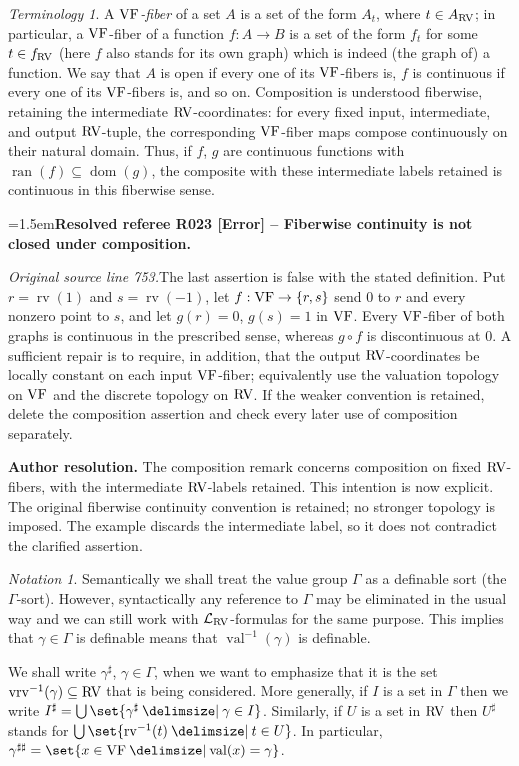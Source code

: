\documentclass[12pt]{amsart}
\newcommand{\ResolvedRefereeRemark}[5]{%
  \par\medskip\begingroup\normalfont\small\color{gray}%
  \emergencystretch=1.5em\noindent\textbf{Resolved referee R#1 [#2] -- #3.}\par\nobreak\noindent #4\par
  \medskip\color{ResolutionGreen}\noindent\textbf{Author resolution.} #5\par
  \endgroup\medskip
}
\newcommand{\memph}[1]{{\color{magenta}\emph{#1}}}
\theoremstyle{plain}
\theoremstyle{definition}
\theoremstyle{remark}
\newtheorem{ter}[thm]{Terminology}
\newtheorem{nota}[thm]{Notation}
\numberwithin{equation}{section}
\theoremstyle{plain}
\newcommand{\VF}{\textup{VF}}
\newcommand{\RV}{\textup{RV}}
\DeclareMathOperator{\ran}{ran}
\DeclareMathOperator{\dom}{dom}
\newcommand{\0}{\emptyset}
\newcommand{\lan}[3]{\mathcal{L}_{#1 \textup{#2} #3}}
\newcommand{\fun}{\longrightarrow}
\newcommand{\sub}{\subseteq}
\providecommand\given{}
\newcommand\SetSymbol[1][]{%
\nonscript \: #1 \vert
\allowbreak
\nonscript\:
\mathopen{}}
\renewcommand\given{\SetSymbol[\delimsize]}
\DeclareMathOperator{\rv}{rv}
\DeclareMathOperator{\vv}{val}
\DeclareMathOperator{\vrv}{vrv}
\begin{document}
\begin{ter}\label{rvfiber}
A \memph{$\VF$-fiber} of a set $A$ is a set of the form $A_t$, where $t \in A_{\RV}$; in particular,  a $\VF$-fiber of a function $f : A \fun B$ is a set of the form $f_t$ for some  $t \in f_{\RV}$ (here $f$ also stands for its own graph) which is indeed (the graph of) a function.  We say that $A$ is open if every one of its $\VF$-fibers is, $f$ is continuous if every one of its $\VF$-fibers is, and so on. Composition is understood fiberwise, retaining the intermediate $\RV$-coordinates: for every fixed input, intermediate, and output $\RV$-tuple, the corresponding $\VF$-fiber maps compose continuously on their natural domain. Thus, if $f$, $g$ are continuous functions with $\ran(f)\sub\dom(g)$, the composite with these intermediate labels retained is continuous in this fiberwise sense.
\end{ter}

\ResolvedRefereeRemark{023}{Error}{Fiberwise continuity is not closed under composition}{%
\textit{Original source line 753.}\quad The last assertion is false with the stated definition. Put $r=\rv(1)$ and $s=\rv(-1)$, let $f:\VF\to\{r,s\}$ send $0$ to $r$ and every nonzero point to $s$, and let $g(r)=0$, $g(s)=1$ in $\VF$. Every $\VF$-fiber of both graphs is continuous in the prescribed sense, whereas $g\circ f$ is discontinuous at $0$. A sufficient repair is to require, in addition, that the output $\RV$-coordinates be locally constant on each input $\VF$-fiber; equivalently use the valuation topology on $\VF$ and the discrete topology on $\RV$. If the weaker convention is retained, delete the composition assertion and check every later use of composition separately.
}{The composition remark concerns composition on fixed $\RV$-fibers, with the intermediate $\RV$-labels retained. This intention is now explicit. The original fiberwise continuity convention is retained; no stronger topology is imposed. The example discards the intermediate label, so it does not contradict the clarified assertion.}


\begin{nota}\label{gamwhat}
Semantically we shall treat the value group $\Gamma$ as a definable sort (the $\Gamma$-sort). However, syntactically any reference to $\Gamma$ may be eliminated in the usual way and we can still work with $\lan{}{RV}{}$-formulas for the same purpose. This implies that $\gamma\in \Gamma$ is definable means that $\vv^{-1}(\gamma)$ is definable.

We shall write $\gamma^\sharp$, $\gamma \in \Gamma$, when we want to emphasize that it is the set $\vrv^{-1}(\gamma) \sub \RV$  that is being considered. More generally, if $I$ is a set in $\Gamma$ then we write $I^\sharp = \bigcup\set{\gamma^\sharp \given \gamma \in I}$. Similarly, if $U$ is a set in $\RV$ then $U^\sharp$ stands for $\bigcup\set{\rv^{-1}(t) \given t \in U}$. In particular, $\gamma^{\sharp \sharp}=\set{ x \in \VF \given \vv(x)=\gamma}$.
\end{nota}
\end{document}
